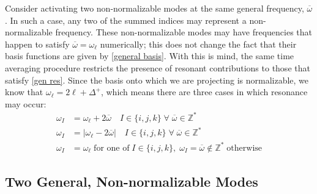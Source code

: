 \documentclass[letterpaper,11pt]{article}
\newcommand{\ol}{\omega_\ell}
\newcommand{\ob}{\overline{\omega}}
\begin{document}
Consider activating two non-normalizable modes at the same general frequency, $\ob$. In such a case, any two of the summed indices may represent a non-normalizable frequency. These non-normalizable modes may have frequencies that happen to satisfy $\ob = \ol$ numerically; this does not change the fact that their basis functions are given by \eqref{general basis}. With this is mind, the same time averaging procedure restricts the presence of resonant contributions to those that satisfy \eqref{gen res}. Since the basis onto which we are projecting is normalizable, we know that $\ol = 2\ell + \Delta^+$, which means there are three cases in which resonance may occur:
\begin{align}
\label{gen NN res}
\omega_I &= \ol + 2\ob \quad I \in \{i,j,k\} \; \forall \; \ob \in \mathbb{Z}^* \\
\omega_I &= | \ol - 2\ob| \quad I \in \{i,j,k\} \; \forall \; \ob \in \mathbb{Z}^* \\
\omega_I &= \ol \; \text{for one of} \; I \in \{i,j,k\}, \; \omega_I = \ob \notin \mathbb{Z}^* \; \text{otherwise}
\end{align}


\subsection{Two General, Non-normalizable Modes}
\end{document}
